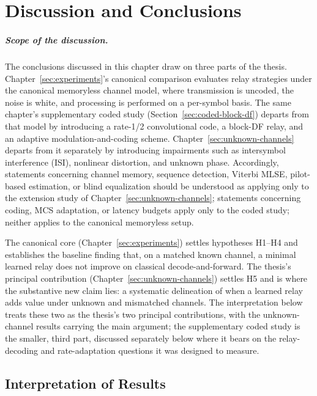\chapter{Discussion and Conclusions}\label{sec:discussion-and-conclusions}

\paragraph{Scope of the discussion.} The conclusions discussed in this chapter draw on three parts of the thesis. Chapter~\ref{sec:experiments}'s canonical comparison evaluates relay strategies under the canonical memoryless channel model, where transmission is uncoded, the noise is white, and processing is performed on a per-symbol basis. The same chapter's supplementary coded study (Section~\ref{sec:coded-block-df}) departs from that model by introducing a rate-1/2 convolutional code, a block-DF relay, and an adaptive modulation-and-coding scheme. Chapter~\ref{sec:unknown-channels} departs from it separately by introducing impairments such as intersymbol interference (ISI), nonlinear distortion, and unknown phase. Accordingly, statements concerning channel memory, sequence detection, Viterbi MLSE, pilot-based estimation, or blind equalization should be understood as applying only to the extension study of Chapter~\ref{sec:unknown-channels}; statements concerning coding, MCS adaptation, or latency budgets apply only to the coded study; neither applies to the canonical memoryless setup.

The canonical core (Chapter~\ref{sec:experiments}) settles hypotheses H1--H4 and establishes the baseline finding that, on a matched known channel, a minimal learned relay does not improve on classical decode-and-forward. The thesis's principal contribution (Chapter~\ref{sec:unknown-channels}) settles H5 and is where the substantive new claim lies: a systematic delineation of when a learned relay adds value under unknown and mismatched channels. The interpretation below treats these two as the thesis's two principal contributions, with the unknown-channel results carrying the main argument; the supplementary coded study is the smaller, third part, discussed separately below where it bears on the relay-decoding and rate-adaptation questions it was designed to measure.

\section{Interpretation of Results}\label{sec:interpretation-of-results}

